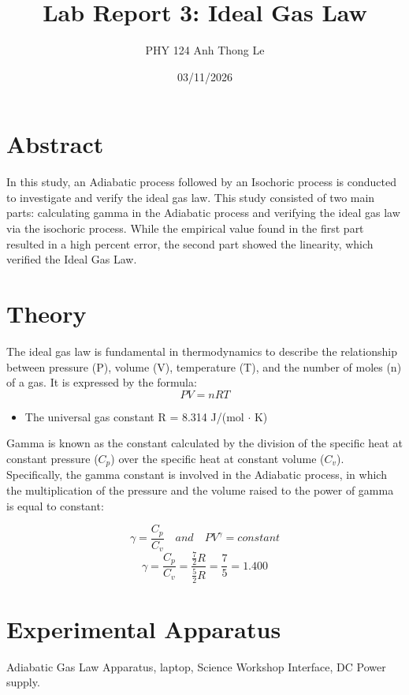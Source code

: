 \documentclass[12pt]{article}
\title{Lab Report 3:  Ideal Gas Law }
\author{PHY 124 \quad Anh Thong Le}
\date{03/11/2026}
\begin{document}
\maketitle
\section{Abstract}
In this study, an Adiabatic process followed by an Isochoric process is conducted to investigate and verify the ideal gas law. This study consisted of two main parts: calculating gamma in the Adiabatic process and verifying the ideal gas law via the isochoric process. While the empirical value found in the first part resulted in a high percent error, the second part showed the linearity, which verified the Ideal Gas Law. 
\section{Theory}

The ideal gas law is fundamental in thermodynamics to describe the relationship between pressure (P), volume (V), temperature (T), and the number of moles (n) of a gas. It is expressed by the formula: 
\begin{equation}
    PV = nRT
\tag{02.01}
\label{IdealGasLaw}
\end{equation}
\begin{itemize}
    \item The universal gas constant R = 8.314 J/(mol $\cdot$ K) 
\end{itemize}

\noindent Gamma is known as the constant calculated by the division of the specific heat at constant pressure ($C_p$) over the specific heat at constant volume ($C_v$). Specifically, the gamma constant is involved in the Adiabatic process, in which the multiplication of the pressure and the volume raised to the power of gamma is equal to constant:

\begin{equation}
        \gamma = \frac{C_p}{C_v} \quad and \quad PV^{\gamma} = constant
\tag{02.02}
\label{PVconst}
\end{equation}
\begin{equation}
        \gamma = \frac{C_p}{C_v} = \frac{\frac{7}{2}R}{\frac{5}{2}R} = \frac{7}{5} = 1.400
\tag{02.03}
\label{theoGamma}
\end{equation}
\section{Experimental Apparatus}
Adiabatic Gas Law Apparatus, laptop, Science Workshop Interface, DC Power supply. 
\end{document}
